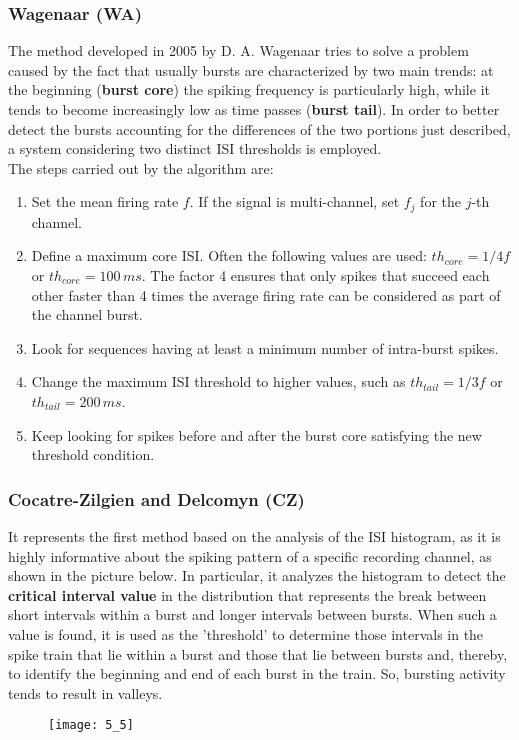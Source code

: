 \subsubsection{Wagenaar (WA)} 
The method developed in 2005 by D. A. Wagenaar tries to solve a problem caused by the fact that usually bursts are characterized by two main trends:
at the beginning (\textbf{burst core}) the spiking frequency is particularly high, while
it tends to become increasingly low as time passes (\textbf{burst tail}). In order to
better detect the bursts accounting for the differences of the two portions just described, a system considering two distinct ISI thresholds is employed. \\
The steps carried out by the algorithm are:
\begin{enumerate}
    \item Set the mean firing rate \(f\). If the signal is multi-channel, set \(f_j\) for the \(j\)-th channel.
    \item Define a maximum core ISI. Often the following values are used: \(th_{core}=1/4f\) or \(th_{core}=100\,ms\). The factor 4 ensures that only spikes that succeed each other faster than 4 times the average firing rate can be considered as part of the channel burst.
    \item Look for sequences having at least a minimum number of intra-burst spikes.
    \item Change the maximum ISI threshold to higher values, such as \(th_{tail}=1/3f\) or \(th_{tail}=200\,ms\).
    \item Keep looking for spikes before and after the burst core satisfying the
          new threshold condition.
\end{enumerate}
\subsubsection{Cocatre-Zilgien and Delcomyn (CZ)} 
It represents the first method based on the analysis of the ISI histogram, as it is highly informative about the spiking pattern of a specific recording channel, as shown in the picture below. In particular, it analyzes the histogram to detect the \textbf{critical interval value} in the distribution that represents the break between short intervals within a burst and longer intervals between bursts. When such a value is found, it is used as the 'threshold' to determine those intervals in the spike train that lie within a burst and those that lie between bursts and, thereby, to identify the beginning and end of each burst in the train. So, bursting activity tends to result in valleys.
\begin{figure}[H]
    \texttt{[image: 5\_5]}
    \centering
\end{figure}

